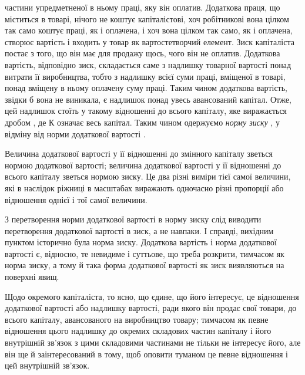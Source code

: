 \parcont{}  %
частини упредметненої в ньому праці, яку він оплатив. Додаткова
праця, що міститься в товарі, нічого не коштує капіталістові,
хоч робітникові вона цілком так само коштує праці, як
і оплачена, і хоч вона цілком так само, як і оплачена, створює
вартість і входить у товар як вартостетворчий елемент. Зиск
капіталіста постає з того, що він має для продажу щось, чого
він не оплатив. Додаткова вартість, відповідно зиск, складається
саме з надлишку товарної вартості понад витрати її виробництва,
тобто з надлишку всієї суми праці, вміщеної в товарі, понад
вміщену в ньому оплачену суму праці. Таким чином додаткова
вартість, звідки б вона не виникала, є надлишок понад увесь
авансований капітал. Отже, цей надлишок стоїть у такому відношенні
до всього капіталу, яке виражається дробом , де
$К$ означає весь капітал. Таким чином одержуємо \emph{норму зиску}
 \deq{} , у відміну від норми додаткової вартості .

Величина додаткової вартості у її відношенні до змінного
капіталу зветься нормою додаткової вартості; величина додаткової
вартості у її відношенні до всього капіталу зветься нормою зиску.
Це два різні виміри тієї самої величини, які в наслідок ріжниці в
масштабах виражають одночасно різні пропорції або відношення
однієї і тої самої величини.

З перетворення норми додаткової вартості в норму зиску
слід виводити перетворення додаткової вартості в зиск, а не
навпаки. І справді, вихідним пунктом історично була норма зиску.
Додаткова вартість і норма додаткової вартості є, відносно, те
невидиме і суттьове, що треба розкрити, тимчасом як норма
зиску, а тому й така форма додаткової вартості як зиск виявляються
на поверхні явищ.

Щодо окремого капіталіста, то ясно, що єдине, що його
інтересує, це відношення додаткової вартості або надлишку вартості,
ради якого він продає свої товари, до всього капіталу,
авансованого на виробництво товару; тимчасом як певне відношення
цього надлишку до окремих складових частин капіталу
і його внутрішній зв’язок з цими складовими частинами не тільки
не інтересує його, але він ще й заінтересований в тому, щоб
оповити туманом це певне відношення і цей внутрішній зв’язок.

